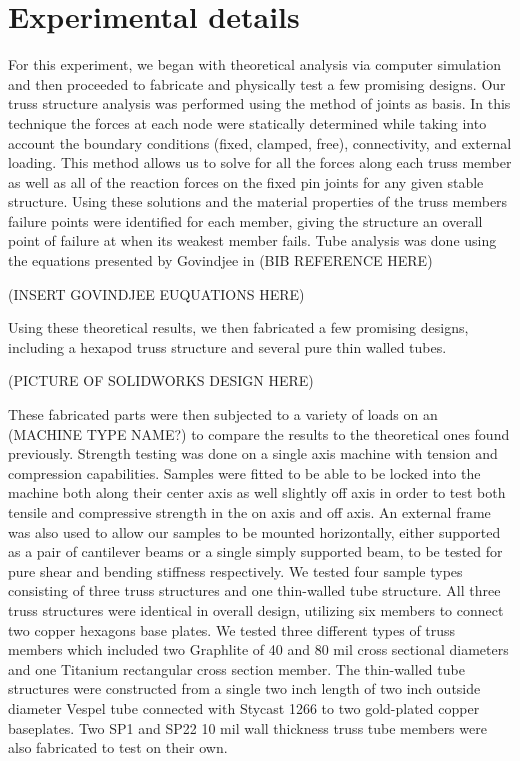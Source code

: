 \documentclass[final]{svjour2}
\begin{document}
\section{Experimental details}
For this experiment, we began with theoretical analysis via computer simulation and then proceeded to fabricate and physically test a few promising designs.  Our truss structure analysis was performed using the method of joints as basis.  In this technique the forces at each node were statically determined while taking into account the boundary conditions (fixed, clamped, free), connectivity, and external loading.  This method allows us to solve for all the forces along each truss member as well as all of the reaction forces on the fixed pin joints for any given stable structure.  Using these solutions and the material properties of the truss members failure points were identified for each member, giving the structure an overall point of failure at when its weakest member fails.  Tube analysis was done using the equations presented by Govindjee in (BIB REFERENCE HERE)

(INSERT GOVINDJEE EUQUATIONS HERE)

Using these theoretical results, we then fabricated a few promising designs, including a hexapod truss structure and several pure thin walled tubes. 

(PICTURE OF SOLIDWORKS DESIGN HERE)  

These fabricated parts were then subjected to a variety of loads on an (MACHINE TYPE NAME?) to compare the results to the theoretical ones found previously.  Strength testing was done on a single axis machine with tension and compression capabilities. Samples were fitted to be able to be locked into the machine both along their center axis as well slightly off axis in order to test both tensile and compressive strength in the on axis and off axis.  An external frame was also used to allow our samples to be mounted horizontally, either supported as a pair of cantilever beams or a single simply supported beam, to be tested for pure shear and bending stiffness respectively.  We tested four sample types consisting of three truss structures and one thin-walled tube structure.  All three truss structures were identical in overall design, utilizing six members to connect two copper hexagons base plates.  We tested three different types of truss members which included two Graphlite of 40 and 80 mil cross sectional diameters and one Titanium rectangular cross section member. The thin-walled tube structures were constructed from a single two inch length of two inch outside diameter Vespel tube connected with Stycast 1266 to two gold-plated copper baseplates. Two SP1 and SP22 10 mil wall thickness truss tube members were also fabricated to test on their own.
\end{document}
